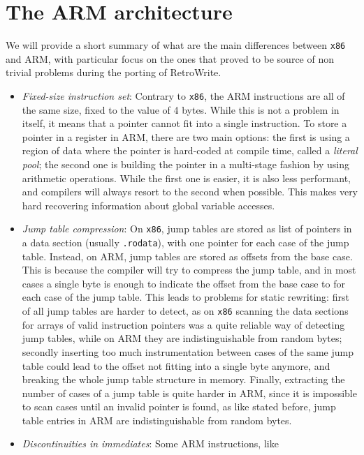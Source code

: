 \documentclass[a4paper,11pt,oneside]{report}
\newcommand{\sysname}{RetroWrite\xspace}
\begin{document}
\section{The ARM architecture}
We will provide a short summary of what are the main differences between 
\texttt{x86} and ARM, with particular focus on the ones that proved to be 
source of non trivial problems during the porting of \sysname.
\begin{itemize}
	\item \emph{Fixed-size instruction set}: Contrary to \texttt{x86}, the ARM 
		instructions are all of the same size, fixed to the value of 4 bytes.  
		While this is not a problem in itself, it means that a pointer cannot 
		fit into a single instruction. To store a pointer in a register in ARM, 
		there are two main options: the first is using a region of data where 
		the pointer is hard-coded at compile time, called a \emph{literal 
		pool}; the second one is building the pointer in a multi-stage fashion 
		by using arithmetic operations.  While the first one is easier, it is 
		also less performant, and compilers will always resort to the second 
		when possible. This makes very hard recovering information about global 
		variable accesses.
	\item \emph{Jump table compression}: On \texttt{x86}, jump tables are 
		stored as list of pointers in a data section (usually 
		\texttt{.rodata}), with one pointer for each case of the jump table.  
		Instead, on ARM, jump tables are stored as offsets from the base case.  
		This is because the compiler will try to compress the jump table, and 
		in most cases a single byte is enough to indicate the offset from the 
		base case to for each case of the jump table. This leads to problems 
		for static rewriting: first of all jump tables are harder to detect, as 
		on \texttt{x86} scanning the data sections for arrays of valid 
		instruction pointers was a quite reliable way of detecting jump tables, 
		while on ARM they are indistinguishable from random bytes; secondly 
		inserting too much instrumentation between cases of the same jump table 
		could lead to the offset not fitting into a single byte anymore, and 
		breaking the whole jump table structure in memory.  Finally, extracting 
		the number of cases of a jump table is quite harder in ARM, since it is 
		impossible to scan cases until an invalid pointer is found, as like 
		stated before, jump table entries in ARM are indistinguishable from 
		random bytes.
	\item \emph{Discontinuities in immediates}: Some ARM instructions, like 

\end{itemize}
\end{document}
